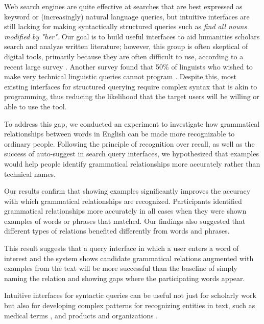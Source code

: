 Web search engines are quite effective at searches that are best expressed as keyword or (increasingly) natural language queries, but intuitive interfaces are still lacking for making syntactically structured queries such as {\it find all nouns modified by "her"}.  Our goal is to build useful interfaces to aid humanities scholars search and analyze written literature; however, this group is often skeptical of digital tools, primarily because they are often difficult to use, according to a recent large survey \cite{gibbs_building_2012}.  Another survey found that 50\% of linguists who wished to make very technical  linguistic queries  cannot program \cite{soehn2008requirements}.  Despite this, most existing interfaces for structured querying require complex syntax that is akin to programming, thus reducing the likelihood that the target users will be willing or able to use the tool.

To address this gap, we conducted an experiment to investigate how grammatical relationships between words in English can be made more recognizable to ordinary people. Following the principle of recognition over recall, as well as the success of auto-suggest in search query interfaces, we hypothesized that examples would help people identify grammatical relationships more accurately rather than technical names.

Our results confirm that showing examples significantly improves the accuracy with which grammatical relationships are recognized. Participants identified grammatical relationships more accurately in all cases when they were  shown examples of words or phrases that matched.
Our findings also suggested that different types of relations benefited differently from words and phrases. 

This result suggests that a query interface in which a user enters a word of interest and the system shows candidate grammatical relations augmented with examples from the text will be more successful than the baseline of simply naming the relation and showing gaps where the participating words appear.

Intuitive interfaces for syntactic queries can be useful not just for scholarly work but also for developing complex patterns for recognizing entities in text, such as medical terms \cite{hirschman2005overview,maclean2013identifying}, and  products and organizations \cite{culotta2005reducing}.


